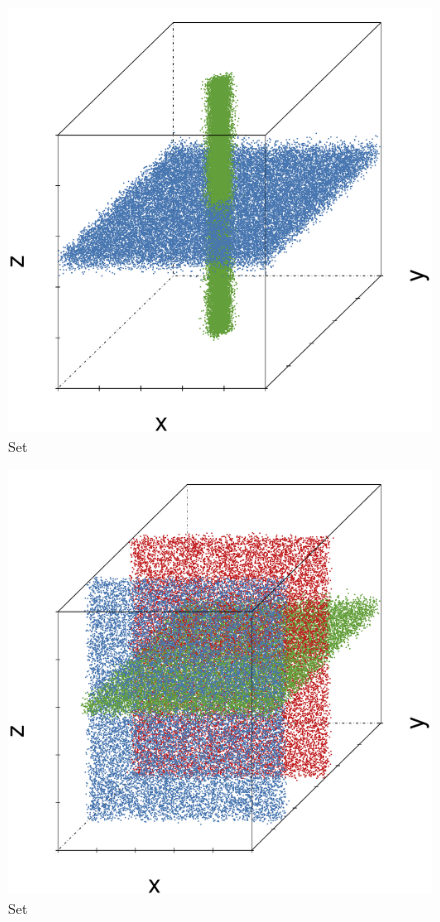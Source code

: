 \begin{subfigure}{0.18\textwidth}
	\centering
	\includegraphics[width=\textwidth]{3/img/datasetplot_ferdosi_4_60000.pdf}
	\caption{Set \ferdosiFour}
	\label{fig:3:simulated:datasets:ferdosi4}
\end{subfigure}
\begin{subfigure}{0.18\textwidth}
	\centering
	\includegraphics[width=\textwidth]{3/img/datasetplot_ferdosi_5_60000.pdf}
	\caption{Set \ferdosiFive}
	\label{fig:3:simulated:datasets:ferdosi5}
\end{subfigure}	